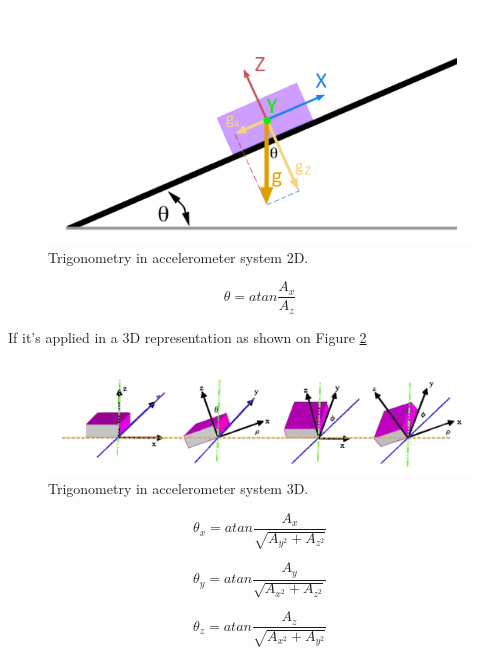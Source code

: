 \begin{figure}[H]
	\center
	\includegraphics[scale=0.4]{imagenes/Balancing_robot/acelerometro1}
	\caption{Trigonometry in accelerometer system 2D.}
	\label{fig:acelerometro1}
\end{figure}

\begin{equation}
\theta = atan\frac{A_{x}}{A_{z}}
\end{equation}

If it’s applied in a 3D representation as shown on Figure \ref{fig:acelerometro2}

\begin{figure}[H]
	\center
	\includegraphics[scale=0.6]{imagenes/Balancing_robot/acelerometro2}
	\caption{Trigonometry in accelerometer system 3D.}
	\label{fig:acelerometro2}
\end{figure}

\begin{equation}
\theta_{x} = atan\frac{A_{x}}{\sqrt{A_{y^2}+A_{z^2}}}
\end{equation}

\begin{equation}
\theta_{y} = atan\frac{A_{y}}{\sqrt{A_{x^2}+A_{z^2}}}
\end{equation}

\begin{equation}
\theta_{z} = atan\frac{A_{z}}{\sqrt{A_{x^2}+A_{y^2}}}
\end{equation}


